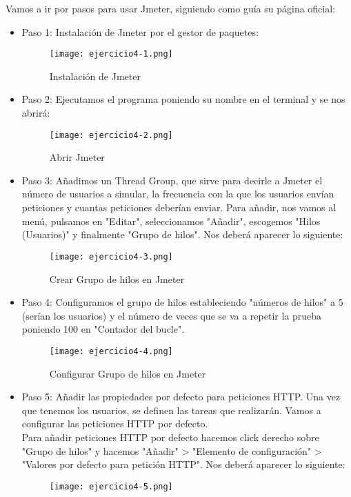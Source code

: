 	Vamos a ir por pasos para usar Jmeter, siguiendo como guía su página oficial\cite{ejercicio4-1}:
	\begin{itemize}
		\item Paso 1: Instalación de Jmeter por el gestor de paquetes:
			\begin{figure}[H] 
				\centering
				\texttt{[image: ejercicio4-1.png]} 
				\label{figura19} 
				\caption{Instalación de Jmeter}
			\end{figure}
		\item Paso 2: Ejecutamos el programa poniendo su nombre en el terminal y se nos abrirá:
			\begin{figure}[H] 
				\centering
				\texttt{[image: ejercicio4-2.png]} 
				\label{figura20} 
				\caption{Abrir Jmeter}
			\end{figure}
		\item Paso 3: Añadimos un Thread Group, que sirve para decirle a Jmeter el número de usuarios a simular, la frecuencia con la que los usuarios envían peticiones y cuantas peticiones deberían enviar. Para añadir, nos vamos al menú, pulsamos en "Editar", seleccionamos "Añadir", escogemos "Hilos (Usuarios)" y finalmente "Grupo de hilos". Nos deberá aparecer lo siguiente:
			\begin{figure}[H] 
				\centering
				\texttt{[image: ejercicio4-3.png]} 
				\label{figura21} 
				\caption{Crear Grupo de hilos en Jmeter}
			\end{figure}
		\item Paso 4: Configuramos el grupo de hilos estableciendo "números de hilos" a 5 (serían los usuarios) y el número de veces que se va a repetir la prueba poniendo 100 en "Contador del bucle".
			\begin{figure}[H] 
				\centering
				\texttt{[image: ejercicio4-4.png]} 
				\label{figura22} 
				\caption{Configurar Grupo de hilos en Jmeter}
			\end{figure}
		\item Paso 5: Añadir las propiedades por defecto para peticiones HTTP. Una vez que tenemos los usuarios, se definen las tareas que realizarán. Vamos a configurar las peticiones HTTP por defecto.\\
		Para añadir peticiones HTTP por defecto hacemos click derecho sobre "Grupo de hilos" y hacemos "Añadir" >  "Elemento de configuración" > "Valores por defecto para petición HTTP". Nos deberá aparecer lo siguiente:
			\begin{figure}[H] 
				\centering
				\texttt{[image: ejercicio4-5.png]} 

\end{figure}
\end{itemize}
